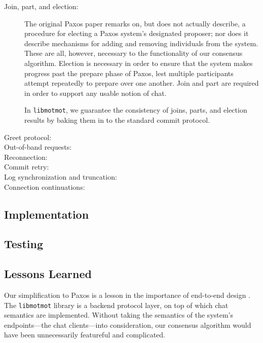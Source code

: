 \documentclass{sig-alternate}
\newcommand\libmotmot{\texttt{libmotmot}\xspace}
\begin{document}
\begin{description}
  \item[Join, part, and election:]
    The original Paxos paper remarks on, but does not actually describe, a
    procedure for electing a Paxos system's designated proposer; nor does it
    describe mechanisms for adding and removing individuals from the system.
    These are all, however, necessary to the functionality of our consensus
    algorithm.  Election is necessary in order to ensure that the system makes
    progress past the prepare phase of Paxos, lest multiple participants
    attempt repeatedly to prepare over one another.  Join and part are required
    in order to support any usable notion of chat.

    In \libmotmot, we guarantee the consistency of joins, parts, and election
    results by baking them in to the standard commit protocol.

  \item[Greet protocol:]

  \item[Out-of-band requests:]

  \item[Reconnection:]

  \item[Commit retry:]

  \item[Log synchronization and truncation:]

  \item[Connection continuations:]
\end{description}

\subsection{Implementation}

\subsection{Testing}

\subsection{Lessons Learned}

Our simplification to Paxos is a lesson in the importance of end-to-end design
\cite{end2end}.  The \libmotmot library is a backend protocol layer, on top of
which chat semantics are implemented.  Without taking the semantics of the
system's endpoints---the chat clients---into consideration, our consensus
algorithm would have been unnecessarily featureful and complicated.
\end{document}
